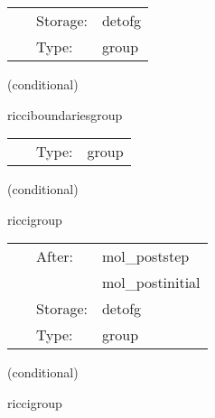 \documentclass{article}
\begin{document}
\hspace{5mm}

 \begin{tabular*}{160mm}{cll} 
~ & Storage:  & detofg \\ 
~ & Type:  & group \\ 
\end{tabular*} 


\vspace{5mm}

   (conditional) 

\hspace{5mm} ricciboundariesgroup 

\hspace{5mm}{\it set ricci tensor on the boundary } 


\hspace{5mm}

 \begin{tabular*}{160mm}{cll} 
~ & Type:  & group \\ 
\end{tabular*} 


\vspace{5mm}

   (conditional) 

\hspace{5mm} riccigroup 

\hspace{5mm}{\it calculate ricci tensor, with boundary conditions } 


\hspace{5mm}

 \begin{tabular*}{160mm}{cll} 
~ & After:  & mol\_poststep \\ 
~& ~ &mol\_postinitial\\ 
~ & Storage:  & detofg \\ 
~ & Type:  & group \\ 
\end{tabular*} 


\vspace{5mm}

   (conditional) 

\hspace{5mm} riccigroup 

\hspace{5mm}{\it calculate ricci tensor, with boundary conditions } 


\hspace{5mm}
\end{document}
